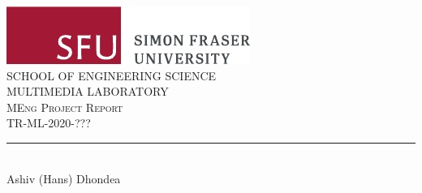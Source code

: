 \begin{titlepage}
	\centering
    \includegraphics[scale = 1.0]{figs/SFU_horizontal_logo_rgb.pdf}\\[1.0 cm]
    \textsc{SCHOOL OF ENGINEERING SCIENCE}\\[0.2 cm]
    \textsc{MULTIMEDIA LABORATORY}\\[2.2 cm]
	\textsc{\Large MEng Project Report}\\[0.5 cm]
	\textsc{\normalsize TR-ML-2020-??? }\\[0.2 cm]
	\rule{\linewidth}{0.2 mm} \\[0.4 cm]


	\vspace*{2cm}
	Ashiv (Hans) Dhondea\linebreak
	\\
	\vspace{5cm}
	\thedate

	\vfill

\end{titlepage}
